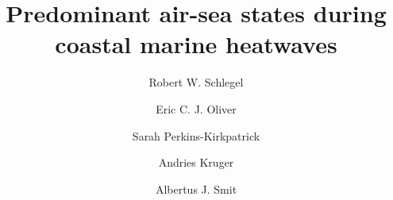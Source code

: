 \documentclass[a4paper,10pt,review]{elsarticle}
\begin{document}
\begin{frontmatter}

\title{Predominant air-sea states during coastal marine heatwaves}

\author[firstaddress]{Robert W. Schlegel}
\author[secondaddress,thirdaddress,fourthaddress]{Eric C. J. Oliver}
\author[fifthaddress]{Sarah Perkins-Kirkpatrick}
\author[sixthaddress,seventhaddress]{Andries Kruger}
\author[firstaddress]{Albertus J. Smit}

\address[firstaddress]{Department of Biodiversity and Conservation Biology, University of the Western Cape, Private Bag X17, Bellville 7535, South Africa}

\address[secondaddress]{ARC Centre of Excellence for Climate System Science, Australia}

\address[thirdaddress]{Institute for Marine and Antarctic Studies, University of Tasmania, Hobart, Australia}

\address[fourthaddress]{Department of Oceanography, Dalhousie University, Halifax, Nova Scotia, Canada}

\address[fifthaddress]{UWA Oceans Institute and School of Plant Biology, The University of Western Australia, Crawley, 6009 Western Australia, Australia}

\address[sixthaddress]{Climate Service, South African Weather Service, Pretoria, South Africa}

\address[seventhaddress]{Department of Geography, Geoinformatics and Meteorology, Faculty of Natural and Agricultural Sciences, University of Pretoria, South Africa}



\end{frontmatter}
\end{document}
